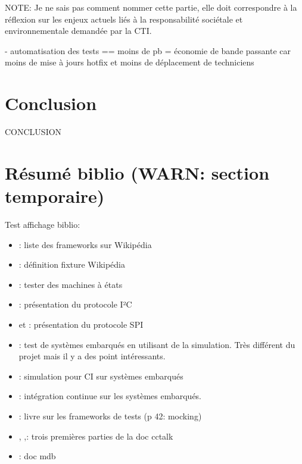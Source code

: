 \documentclass[a4paper]{article}
\begin{document}
NOTE: Je ne sais pas comment nommer cette partie, elle doit correspondre à la
réflexion sur les enjeux actuels liés à la responsabilité sociétale et
environnementale demandée par la CTI.

- automatisation des tests == moins de pb = économie de bande passante car moins
  de mise à jours hotfix et moins de déplacement de techniciens

\clearpage

\section*{Conclusion}

CONCLUSION



\section{Résumé biblio (WARN: section temporaire)}

Test affichage biblio:

\begin{itemize}
  \item \cite{enwikiframeworks}: liste des frameworks sur Wikipédia
  \item \cite{enwikifixtures}: définition fixture Wikipédia
  \item \cite{teststatemachines}: tester des machines à états
  \item \cite{mankar2014review}: présentation du protocole I²C
  \item \cite{dhaker2018introduction} et \cite{li2014design}: présentation du
    protocole SPI
  \item \cite{articleembeddedtests}: test de systèmes embarqués en utilisant de
    la simulation. Très différent du projet mais il y a des point intéressants.
  \item \cite{engblom2015continuous}: simulation pour CI sur systèmes embarqués
  \item \cite{maartensson2016continuous}: intégration continue sur les systèmes
    embarqués.
  \item \cite{hamill2004unit}: livre sur les frameworks de tests (p 42: mocking)
  \item \cite{cctalkpt1}, \cite{cctalkpt2},\cite{cctalkpt3}: trois premières
    parties de la doc cctalk
  \item \cite{mdbdoc}: doc mdb
\end{itemize}
\end{document}
